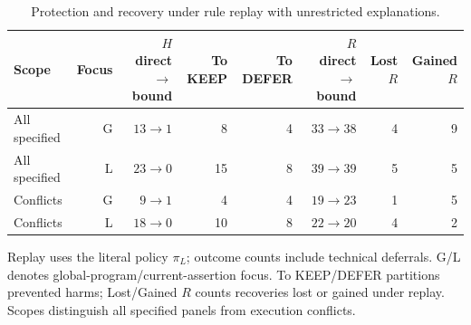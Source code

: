 \begin{table}[t]
\centering
\small
\caption{Protection and recovery under rule replay with unrestricted explanations.}
\label{tab:reason_binding}
\begin{tabular}{lrrrrrrr}
\toprule
Scope & Focus & $H$ direct$\to$bound & To KEEP & To DEFER & $R$ direct$\to$bound & Lost $R$ & Gained $R$ \\
\midrule
All specified & G & $13\to 1$ & 8 & 4 & $33\to 38$ & 4 & 9 \\
All specified & L & $23\to 0$ & 15 & 8 & $39\to 39$ & 5 & 5 \\
Conflicts & G & $9\to 1$ & 4 & 4 & $19\to 23$ & 1 & 5 \\
Conflicts & L & $18\to 0$ & 10 & 8 & $22\to 20$ & 4 & 2 \\
\bottomrule
\end{tabular}
\par\smallskip
\begin{minipage}{\linewidth}
\footnotesize
Replay uses the literal policy $\pi_L$; outcome counts include technical deferrals. G/L denotes global-program/current-assertion focus. To KEEP/DEFER partitions prevented harms; Lost/Gained $R$ counts recoveries lost or gained under replay. Scopes distinguish all specified panels from execution conflicts.
\end{minipage}
\end{table}

